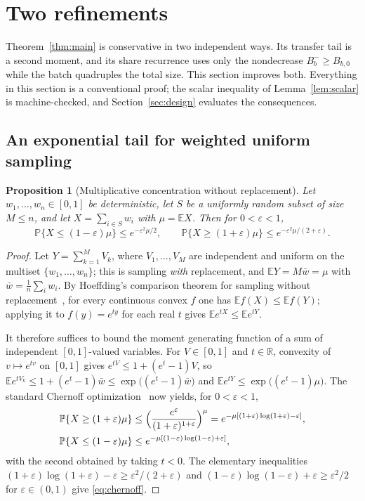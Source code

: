 \documentclass[11pt,a4paper]{article}
\theoremstyle{plain}
\newtheorem{proposition}[theorem]{Proposition}
\theoremstyle{definition}
\theoremstyle{remark}
\newcommand{\R}{\mathbb R}
\newcommand{\Prob}{\mathbb P}
\newcommand{\E}{\mathbb E}
\newcommand{\eps}{\varepsilon}
\begin{document}
\section{Two refinements}\label{sec:refine}

Theorem~\ref{thm:main} is conservative in two independent ways. Its transfer
tail is a second moment, and its share recurrence uses only the nondecrease
$B_b^-\ge B_{b,0}$ while the batch quadruples the total size. This section
improves both. Everything in this section is a conventional proof; the scalar
inequality of Lemma~\ref{lem:scalar} is machine-checked, and
Section~\ref{sec:design} evaluates the consequences.

\subsection{An exponential tail for weighted uniform sampling}\label{sec:chernoff}

\begin{proposition}[Multiplicative concentration without replacement]\label{prop:chernoff}
Let $w_1,\dots,w_n\in[0,1]$ be deterministic, let $S$ be a uniformly random
subset of size $M\le n$, and let $X=\sum_{i\in S}w_i$ with $\mu=\E X$. Then for
$0<\eps<1$,
\begin{equation}\label{eq:chernoff}
\Prob\{X\le(1-\eps)\mu\}\le e^{-\eps^2\mu/2},\qquad
\Prob\{X\ge(1+\eps)\mu\}\le e^{-\eps^2\mu/(2+\eps)} .
\end{equation}
\end{proposition}

\begin{proof}
Let $Y=\sum_{k=1}^MV_k$, where $V_1,\dots,V_M$ are independent and uniform on
the multiset $\{w_1,\dots,w_n\}$; this is sampling \emph{with} replacement, and
$\E Y=M\bar w=\mu$ with $\bar w=\frac1n\sum_iw_i$. By Hoeffding's comparison
theorem for sampling without replacement~\citep[Thm.~4]{hoeffding1963}, for
every continuous convex $f$ one has $\E f(X)\le\E f(Y)$; applying it to
$f(y)=e^{ty}$ for each real $t$ gives $\E e^{tX}\le\E e^{tY}$.

It therefore suffices to bound the moment generating function of a sum of
independent $[0,1]$-valued variables. For $V\in[0,1]$ and $t\in\R$, convexity of
$v\mapsto e^{tv}$ on $[0,1]$ gives $e^{tV}\le1+(e^t-1)V$, so
$\E e^{tV_k}\le1+(e^t-1)\bar w\le\exp\bigl((e^t-1)\bar w\bigr)$ and
$\E e^{tY}\le\exp\bigl((e^t-1)\mu\bigr)$. The standard Chernoff
optimization~\citep{chernoff1952,boucheron2013} now yields, for $0<\eps<1$,
\begin{align*}
\Prob\{X\ge(1+\eps)\mu\}&\le
\Bigl(\frac{e^{\eps}}{(1+\eps)^{1+\eps}}\Bigr)^{\mu}
=e^{-\mu[(1+\eps)\log(1+\eps)-\eps]},\\
\Prob\{X\le(1-\eps)\mu\}&\le e^{-\mu[(1-\eps)\log(1-\eps)+\eps]},
\end{align*}
with the second obtained by taking $t<0$. The elementary inequalities
$(1+\eps)\log(1+\eps)-\eps\ge\eps^2/(2+\eps)$ and
$(1-\eps)\log(1-\eps)+\eps\ge\eps^2/2$ for $\eps\in(0,1)$ give
\eqref{eq:chernoff}.
\end{proof}
\end{document}
